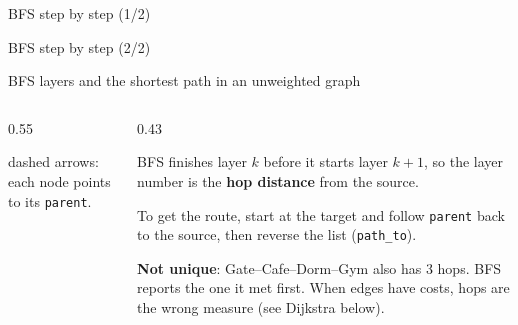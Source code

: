 \documentclass[aspectratio=169,10pt]{beamer}
\newcommand{\gA}{white}\newcommand{\gB}{white}\newcommand{\gC}{white}\newcommand{\gD}{white}\newcommand{\gE}{white}\newcommand{\gF}{white}
\newcommand{\campus}[1]{%
  \coordinate (pg) at (0,0); \coordinate (pl) at (2.6,1.5); \coordinate (pc) at (2.6,-1.5);
  \coordinate (pb) at (5.6,1.5); \coordinate (pd) at (5.6,-1.5); \coordinate (py) at (8.2,0);
  \ifnum#1=1
    \draw[tdInk!60] (pg) -- node[wl] {4} (pl); \draw[tdInk!60] (pg) -- node[wl] {2} (pc);
    \draw[tdInk!60] (pl) -- node[wl] {5} (pb); \draw[tdInk!60] (pl) -- node[wl,pos=0.3] {6} (pd);
    \draw[tdInk!60] (pc) -- node[wl] {3} (pd); \draw[tdInk!60] (pb) -- node[wl] {6} (py); \draw[tdInk!60] (pd) -- node[wl] {2} (py);
  \else
    \foreach \u/\v in {pg/pl,pg/pc,pl/pb,pl/pd,pc/pd,pb/py,pd/py}{\draw[tdInk!60] (\u) -- (\v);}
  \fi
  \node[gn,fill=\gA] (gate) at (pg) {Gate}; \node[gn,fill=\gB] (lib) at (pl) {Lib}; \node[gn,fill=\gC] (cafe) at (pc) {Cafe};
  \node[gn,fill=\gD] (lab) at (pb) {Lab}; \node[gn,fill=\gE] (dorm) at (pd) {Dorm}; \node[gn,fill=\gF] (gym) at (py) {Gym};}
\begin{document}
\begin{frame}{BFS step by step (1/2)}

\end{frame}

\begin{frame}{BFS step by step (2/2)}

\end{frame}

\begin{frame}{BFS layers and the shortest path in an unweighted graph}
\begin{columns}[T]
\begin{column}{0.55\textwidth}
\begin{sfig}[0.55]
\end{sfig}
{\scriptsize dashed arrows: each node points to its \texttt{parent}.}
\end{column}
\begin{column}{0.43\textwidth}
{\small
BFS finishes layer $k$ before it starts layer $k+1$, so the layer number is the \textbf{hop distance} from the source.

\vspace{2mm}
To get the route, start at the target and follow \texttt{parent} back to the source, then reverse the list (\texttt{path\_to}).

\vspace{2mm}
\textbf{Not unique}: Gate--Cafe--Dorm--Gym also has 3 hops. BFS reports the one it met first. When edges have costs, hops are the wrong measure (see Dijkstra below).}
\end{column}
\end{columns}
\end{frame}
\end{document}
